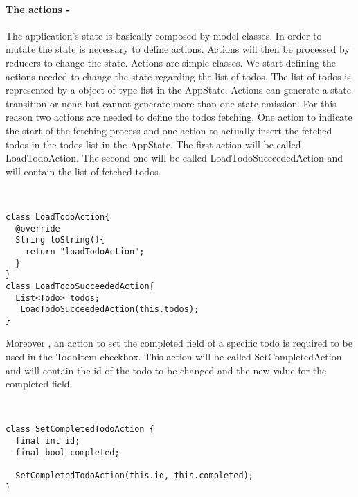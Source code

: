 \paragraph{The actions - }
\label{subpar:todo_app_bloc_core_state}
The application’s state is basically composed by model classes. In order to mutate the state is necessary to define actions. Actions will then be processed by reducers to change the state. Actions are simple classes. We start defining the actions needed to change the state regarding the list of todos. The list of todos is represented by a object of type list in the AppState. Actions can generate a state transition or none but cannot generate more than one state emission. For this reason two actions are needed to define the todos fetching. One action to indicate the start of the fetching process and one action to actually insert the fetched todos in the todos list in the AppState. The first action will be called LoadTodoAction. The second one will be called LoadTodoSucceededAction and will contain the list of fetched todos.
\begin{code}
\mbox{}\\
 \mbox{}
		\label{code:2.14}
\begin{verbatim}
class LoadTodoAction{
  @override
  String toString(){
    return "loadTodoAction";
  }
}
class LoadTodoSucceededAction{
  List<Todo> todos;
   LoadTodoSucceededAction(this.todos);
}
\end{verbatim}
\mbox{}
\end{code}

Moreover , an action to set the completed field of a specific todo is required to be used in the TodoItem checkbox. This action will be called SetCompletedAction and will contain the id of the todo to be changed and the new value for the completed field.
\begin{code}
\mbox{}\\
 \mbox{}
		\label{code:2.14}
\begin{verbatim}
class SetCompletedTodoAction {
  final int id;
  final bool completed;

  SetCompletedTodoAction(this.id, this.completed);
}
\end{verbatim}
\mbox{}
\end{code}


